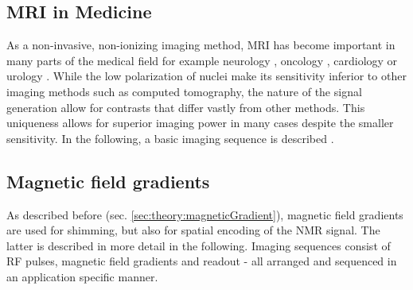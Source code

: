         \subsection{MRI in Medicine}
        As a non-invasive, non-ionizing imaging method, MRI has become important in many parts of the medical field for example neurology \cite{frisoni_clinical_2010}, oncology \cite{padhani_dynamic_2002}, cardiology \cite{constantine_role_2004} or urology \cite{stoianovici_mri_2007}. While the low polarization of nuclei make its sensitivity inferior to other imaging methods such as computed tomography, the nature of the signal generation allow for contrasts that differ vastly from other methods. This uniqueness allows for superior imaging power in many cases despite the smaller sensitivity. In the following, a basic imaging sequence is described \cite{noauthor_wiley-vch_nodate}.
        \subsection{Magnetic field gradients}
        As described before (sec. \ref{sec:theory:magneticGradient}), magnetic field gradients are used for shimming, but also for spatial encoding of the NMR signal. The latter is described in more detail in the following. Imaging sequences consist of RF pulses, magnetic field gradients and readout - all arranged and sequenced in an application specific manner.
